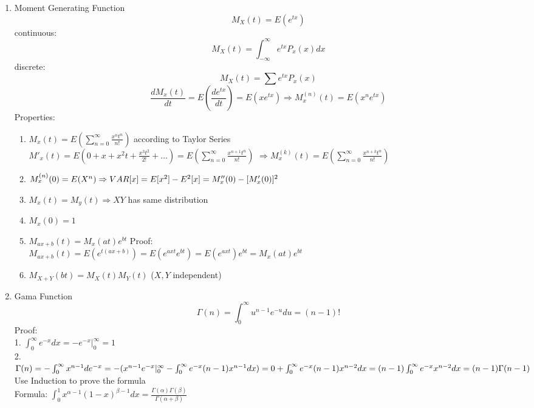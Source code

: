 \documentclass[10pt]{article}
\begin{document}
  
	\begin{multicols}{2}
		\begin{enumerate}
			\item Moment Generating Function\\
			$$M_X(t) = E(e^{tx})$$
			continuous: $$M_X(t) = \int_{-\infty}^{\infty}e^{tx}P_x(x)dx$$
			discrete: $$M_X(t) = \sum e^{tx}P_x(x)$$
			$$\frac{dM_x(t)}{dt} = E(\frac{de^{tx}}{dt}) = E(xe^{tx})\Rightarrow M^{(n)}_x(t) = E(x^ne^{tx})$$
			Properties:
			\begin{enumerate}
				\item $M_x(t) = E(\sum_{n=0}^{\infty}\frac{x^nt^n}{n!})$ according to Taylor Series\\
				$M'_x(t) = E(0+x+x^2t + \frac{x^3t^2}{2!} + \dots) = E(\sum_{n=0}^{\infty}\frac{x^{n+1}t^n}{n!})$
				$\Rightarrow M^{(k)}_x(t) = E(\sum_{n=0}^{\infty}\frac{x^{n+k}t^n}{n!})$
				\item $M_x^{(n)}(0) = E(X^n) \\ \Rightarrow VAR[x]=E[x^2] - E^2[x] = M_x''(0) - [M_x'(0)]^2 $
				\item $M_x(t) = M_y(t) \Rightarrow X Y$ has same distribution
				\item $M_x(0) = 1$
				\item $M_{ax + b}(t) = M_x(at)e^{bt}$   Proof:\\ $M_{ax+b}(t) = E(e^{t(ax+b)}) = E(e^{axt}e^{bt}) = E(e^{axt})e^{bt} = M_x(at)e^{bt}$
				\item $M_{X+Y}(bt) = M_X(t)M_Y(t)$ ($X,Y$ independent)
			\end{enumerate}
		
			\item Gama Function\\
			$$\Gamma(n) = \int_{0}^{\infty}u^{n-1}e^{-u}du = (n-1)!$$
			Proof:\\
			1. $\int_{0}^{\infty}e^{-x}dx = -e^{-x}|_0^{\infty} = 1$\\
			2. $\Gamma(n) = -\int_{0}^{\infty}x^{n-1}de^{-x}\\
			= - (x^{n-1}e^{-x}|_0^{\infty} - \int_{0}^{\infty}e^{-x}(n-1)x^{n-1}dx)\\
			= 0 + \int_{0}^{\infty}e^{-x}(n-1)x^{n-2}dx\\
			= (n-1)\int_{0}^{\infty}e^{-x}x^{n-2}dx\\
			= (n-1)\Gamma(n-1)$\\
			Use Induction to prove the formula\\
			Formula: $\int_{0}^{1}x^{\alpha-1}(1-x)^{\beta-1}dx = \frac{\Gamma(\alpha)\Gamma(\beta)}{\Gamma(\alpha + \beta)}$
			

\end{enumerate}
\end{multicols}
\end{document}
